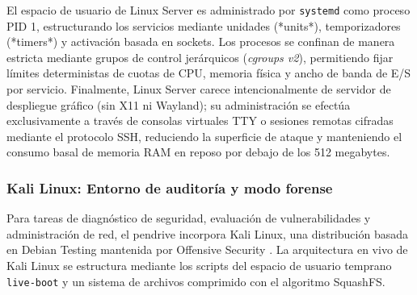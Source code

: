 \documentclass[12pt]{article}
\begin{document}
El espacio de usuario de Linux Server es administrado por \texttt{systemd} como proceso PID 1, estructurando los servicios mediante unidades (*units*), temporizadores (*timers*) y activación basada en sockets. Los procesos se confinan de manera estricta mediante grupos de control jerárquicos (\textit{cgroups v2}), permitiendo fijar límites deterministas de cuotas de CPU, memoria física y ancho de banda de E/S por servicio. Finalmente, Linux Server carece intencionalmente de servidor de despliegue gráfico (sin X11 ni Wayland); su administración se efectúa exclusivamente a través de consolas virtuales TTY o sesiones remotas cifradas mediante el protocolo SSH, reduciendo la superficie de ataque y manteniendo el consumo basal de memoria RAM en reposo por debajo de los 512 megabytes.

\subsubsection{Kali Linux: Entorno de auditoría y modo forense}

Para tareas de diagnóstico de seguridad, evaluación de vulnerabilidades y administración de red, el pendrive incorpora Kali Linux, una distribución basada en Debian Testing mantenida por Offensive Security \parencite{offensive2024kali}. La arquitectura en vivo de Kali Linux se estructura mediante los scripts del espacio de usuario temprano \texttt{live-boot} y un sistema de archivos comprimido con el algoritmo SquashFS.
\end{document}
